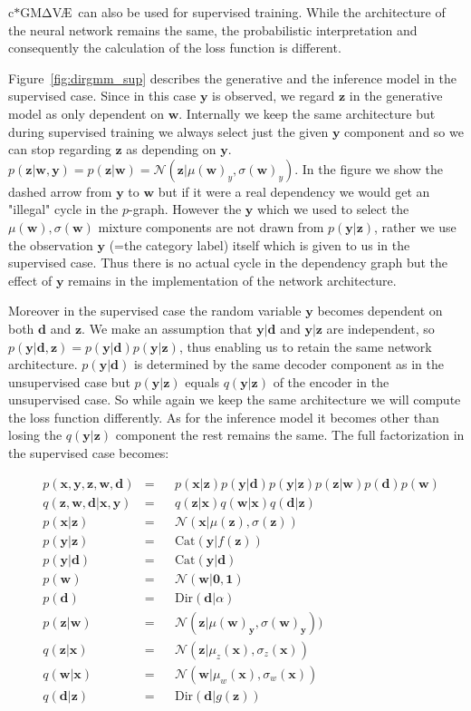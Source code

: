 \documentclass[11pt, a4paper]{report}
\theoremstyle{plain}
\theoremstyle{definition}
\theoremstyle{remark}
\newcommand{\x}{\mathbf{x}}
\newcommand{\z}{\mathbf{z}}
\newcommand{\y}{\mathbf{y}}
\newcommand{\w}{\mathbf{w}}
\newcommand{\dd}{\mathbf{d}}
\newcommand{\NN}{\mathcal{N}}
\newcommand{\bv}[1]{\boldsymbol{#1}}
\newcommand{\gmvae}{c$\ast$GM$\mathrm{\Delta}$V\AE~}
\begin{document}
\gmvae can also be used for supervised training. While the
architecture of the neural network remains the same, the probabilistic
interpretation and consequently the calculation of the loss function is
different.

Figure~\ref{fig:dirgmm_sup} describes the generative and the inference model in
the supervised case.
Since in this case $\y$ is observed, we regard $\z$ in the generative model
as only dependent on $\w$. Internally we keep the same architecture but during
supervised training we always select just the given $\y$ component and so we
can stop regarding $\z$ as depending on $\y$.
$p(\z | \w, \y) = p(\z | \w) = \NN(\z | \mu(\w)_y, \sigma(\w)_y)$.
In the figure we show the dashed arrow from $\y$ to $\w$ but if it were a real
dependency we would get an "illegal" cycle in the $p$-graph. However the $\y$
which we used to select the $\mu(\w), \sigma(\w)$ mixture components are not
drawn from $p(\y | \z)$, rather we use the observation $\y$ (=the category
label) itself which is
given to us in the supervised case. Thus there is no actual cycle in the
dependency graph but the effect of $\y$ remains in the implementation of the
network architecture. 

Moreover in the supervised case the random variable $\y$ becomes dependent on both $\dd$ and $\z$.
We make an assumption that $\y | \dd$ and $\y | \z$ are independent, so
$p(\y | \dd, \z) = p(\y | \dd)p(\y | \z)$, thus enabling us to retain the same 
network architecture. $p(\y | \dd)$ is determined by
the same decoder component as in the unsupervised case but $p(\y | \z)$ equals 
$q(\y | \z)$ of the encoder in the unsupervised case. So while again we keep the same
architecture we will compute the loss function differently.
As for the inference model it becomes other than losing the $q(\y | \z)$
component the rest remains the same.
The full factorization in the supervised case becomes:

\begin{equation}
\begin{aligned}
&p(\x, \y, \z, \w, \dd) &=& 
&p(\x | \z) p(\y | \dd) p(\y | \z) p(\z | \w) p(\dd) p(\w) \\
&q(\z, \w, \dd | \x, \y) &=& 
&q(\z | \x) q(\w | \x) q(\dd | \z) \\
&p(\x | \z) &=& & \NN(\x | \mu(\z), \sigma(\z)) \\
&p(\y | \z) &=& &\text{Cat}(\y | f(\z)) \\
&p(\y | \dd) &=& & \text{Cat}(\y | \dd) \\
&p(\w) &=& & \NN(\w | \bv{0},\bv{1}) \\
&p(\dd) &=& & \text{Dir}(\dd | \alpha) \\
&p(\z | \w) &=& & \NN(\z | \mu(\w)_{\y}, \sigma(\w)_{\y})) \\
&q(\z | \x) &=& &\NN(\z | \mu_z(\x), \sigma_z(\x)) \\
&q(\w | \x) &=& &\NN(\w | \mu_w(\x), \sigma_w(\x)) \\
&q(\dd | \z) &=& &\text{Dir}(\dd | g(\z))
\label{eq:gmmfact_supervised}
\end{aligned}
\end{equation}
\end{document}
